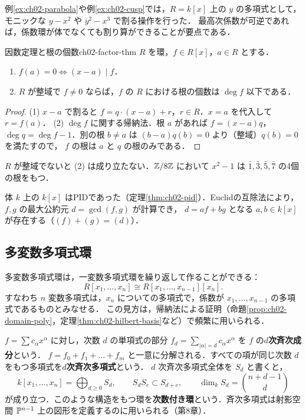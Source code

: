 例\ref{ex:ch02-parabola}や例\ref{ex:ch02-cusp}では，$R=k[x]$ 上の $y$ の多項式として，モニックな $y-x^2$ や $y^2-x^3$ で割る操作を行った．
最高次係数が可逆であれば，係数環が体でなくても割り算ができることが要点である．

\begin{mycor}{因数定理と根の個数}{ch02-factor-thm}
$R$ を環，$f\in R[x]$，$a\in R$ とする．
\begin{enumerate}
  \item $f(a)=0\iff(x-a)\mid f$．
  \item $R$ が整域で $f\ne0$ ならば，$f$ の $R$ における根の個数は $\deg f$ 以下である．
\end{enumerate}
\end{mycor}

\begin{proof}
(1) $x-a$ で割ると $f=q\cdot(x-a)+r$，$r\in R$．$x=a$ を代入して $r=f(a)$．
(2) $\deg f$ に関する帰納法．根 $a$ があれば $f=(x-a)q$，$\deg q=\deg f-1$．別の根 $b\ne a$ は $(b-a)q(b)=0$ より（整域）$q(b)=0$ を満たすので，
$f$ の根は $a$ と $q$ の根のみである．
\end{proof}

$R$ が整域でないと (2) は成り立たない．$\mathbb{Z}/8\mathbb{Z}$ において $x^2-1$ は $\bar1,\bar3,\bar5,\bar7$ の4個の根をもつ．

体 $k$ 上の $k[x]$ はPIDであった（定理\ref{thm:ch02-pid}）．Euclidの互除法により，$f,g$ の最大公約元 $d=\gcd(f,g)$ が計算でき，
$d=af+bg$ となる $a,b\in k[x]$ が存在する（$(f)+(g)=(d)$）．

\subsection{多変数多項式環}

多変数多項式環は，一変数多項式環を繰り返して作ることができる：
\[
  R[x_1,\dots,x_n]\cong R[x_1,\dots,x_{n-1}][x_n].
\]
すなわち $n$ 変数多項式は，$x_n$ についての多項式で，係数が $x_1,\dots,x_{n-1}$ の多項式であるものとみなせる．
この見方は，帰納法による証明（命題\ref{prop:ch02-domain-poly}，定理\ref{thm:ch02-hilbert-basis}など）で頻繁に用いられる．

$f=\sum c_\alpha x^\alpha$ に対し，次数 $d$ の単項式の部分 $f_d=\sum_{|\alpha|=d}c_\alpha x^\alpha$ を $f$ の\textbf{$d$次斉次成分}という．
$f=f_0+f_1+\dots+f_m$ と一意に分解される．すべての項が同じ次数 $d$ をもつ多項式を\textbf{$d$次斉次多項式}という．
$d$ 次斉次多項式全体を $S_d$ と書くと，
\[
  k[x_1,\dots,x_n]=\bigoplus_{d\ge0}S_d,\qquad S_dS_e\subset S_{d+e},\qquad \dim_kS_d=\binom{n+d-1}{d}
\]
が成り立つ．このような構造をもつ環を\textbf{次数付き環}という．斉次多項式は射影空間 $\mathbb{P}^{n-1}$ 上の図形を定義するのに用いられる（第8章）．

